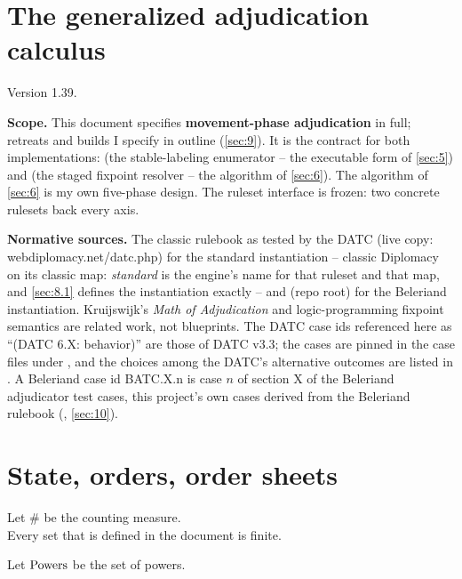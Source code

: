 \documentclass[12pt,a4paper]{article}
\begin{document}

\section*{The generalized adjudication calculus}

Version 1.39.

\textbf{Scope.}
This document specifies \textbf{movement-phase adjudication} in full; retreats and builds I specify in outline (\cref{sec:9}).
It is the contract for both implementations:  (the stable-labeling enumerator -- the executable form of \cref{sec:5}) and  (the staged fixpoint resolver -- the algorithm of \cref{sec:6}).
The algorithm of \cref{sec:6} is my own five-phase design.
The ruleset interface is frozen: two concrete rulesets back every axis.

\textbf{Normative sources.}
The classic rulebook as tested by the DATC (live copy: webdiplomacy.net/datc.php) for the standard instantiation -- classic Diplomacy on its classic map: \emph{standard} is the engine's name for that ruleset and that map, and \cref{sec:8.1} defines the instantiation exactly -- and  (repo root) for the Beleriand instantiation.
Kruijswijk's \emph{Math of Adjudication} and logic-programming fixpoint semantics are related work, not blueprints.
The DATC case ids referenced here as ``(DATC 6.X: behavior)'' are those of DATC v3.3; the cases are pinned in the case files under , and the choices among the DATC's alternative outcomes are listed in .
A Beleriand case id BATC.X.n is case $n$ of section X of the Beleriand adjudicator test cases, this project's own cases derived from the Beleriand rulebook (, \cref{sec:10}).

\section{State, orders, order sheets}\label{sec:1}

Let $\#$ be the counting measure.\\
Every set that is defined in the document is finite.

Let $\mathrm{Powers}$ be the set of powers.
\end{document}

